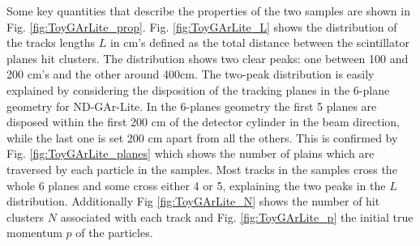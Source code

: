 Some key quantities that describe the properties of the two samples are shown in Fig. \ref{fig:ToyGArLite_prop}. Fig. \ref{fig:ToyGArLite_L} shows the distribution of the tracks lengths $L$ in cm's defined as the total distance between the scintillator planes hit clusters. The distribution shows two clear peaks: one between 100 and 200 cm's and the other around 400cm. The two-peak distribution is easily explained by considering the disposition of the tracking planes in the 6-plane geometry for ND-GAr-Lite. In the 6-planes geometry the first 5 planes are disposed within the first 200 cm of the detector cylinder in the beam direction, while the last one is set 200 cm apart from all the others. This is confirmed by Fig. \ref{fig:ToyGArLite_planes} which shows the number of plains which are traversed by each particle in the samples. Most tracks in the samples cross the whole 6 planes and some cross either 4 or 5, explaining the two peaks in the $L$ distribution. Additionally Fig \ref{fig:ToyGArLite_N} shows the number of hit clusters $N$ associated with each track and Fig. \ref{fig:ToyGArLite_p} the initial true momentum $p$ of the particles.


